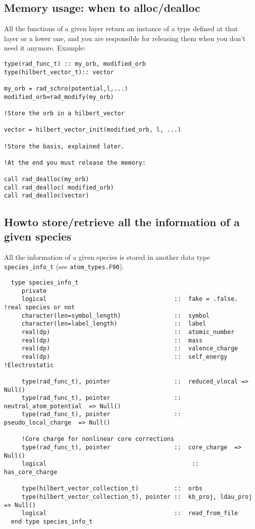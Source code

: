 \documentclass[12pt]{article}
\begin{document}
\subsection{Memory usage: when to alloc/dealloc }
All the functions of a given layer return an instance of a type defined at that layer or
a lower one, and you are responsible for releasing them when you don't need it anymore.
Example:

\begin{verbatim}
type(rad_func_t) :: my_orb, modified_orb
type(hilbert_vector_t):: vector

my_orb = rad_schro(potential,l,...)
modified_orb=rad_modify(my_orb)

!Store the orb in a hilbert_vector

vector = hilbert_vector_init(modified_orb, l, ...)

!Store the basis, explained later.

!At the end you must release the memory:

call rad_dealloc(my_orb)
call rad_dealloc( modified_orb)
call rad_dealloc(vector)
\end{verbatim}


\subsection{Howto store/retrieve all the information of a given species}
All the information of a given species is stored in another data type \verb|species_info_t| (see
\verb|atom_types.F90|).

\begin{verbatim}
  type species_info_t
     private
     logical                                    ::  fake = .false. !real species or not
     character(len=symbol_length)               ::  symbol
     character(len=label_length)                ::  label
     real(dp)                                   ::  atomic_number          
     real(dp)                                   ::  mass
     real(dp)                                   ::  valence_charge   
     real(dp)                                   ::  self_energy !Electrostatic

     type(rad_func_t), pointer                  ::  reduced_vlocal => Null()
     type(rad_func_t), pointer                  ::  neutral_atom_potential  => Null()
     type(rad_func_t), pointer                  ::  pseudo_local_charge  => Null()

     !Core charge for nonlinear core corrections
     type(rad_func_t), pointer                  ::  core_charge  => Null()
     logical                                         ::  has_core_charge
      
     type(hilbert_vector_collection_t)          ::  orbs
     type(hilbert_vector_collection_t), pointer ::  kb_proj, ldau_proj  => Null()
     logical                                    ::  read_from_file
  end type species_info_t
\end{verbatim}
\end{document}

